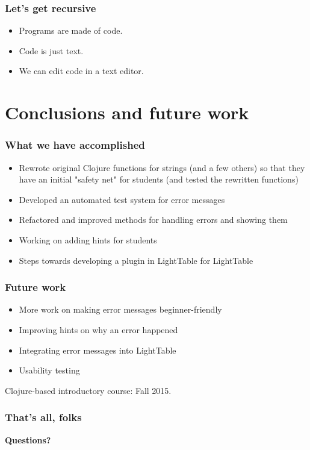 \documentclass{beamer}
\newcommand{\comment}[1]{{\bf \tt  {#1}}}
\newcommand{\emcomment}[1]{\textcolor{ForestGreen}{\comment{Elena: {#1}}}}
\begin{document}
\begin{frame}
\frametitle{Let's get recursive}
	\begin{itemize}
	\item Programs are made of code.
	\item Code is just text.
	\item We can edit code in a text editor.
	\end{itemize}
\end{frame} 

\section{Conclusions and future work}

\begin{frame}[fragile]
\frametitle{What we have accomplished}
\begin{itemize}
\item Rewrote original Clojure functions for strings (and a few others) so that they have an initial "safety net" for students (and tested the rewritten functions)
\item Developed an automated test system for error messages
\item Refactored and improved methods for handling errors and showing them 
\item Working on adding hints for students
\item Steps towards developing a plugin in LightTable for LightTable
\end{itemize}
\end{frame}

\begin{frame}[fragile]
\frametitle{Future work}
\begin{itemize}
\item More work on making error messages beginner-friendly
\item Improving hints on why an error happened
\item Integrating error messages into LightTable
\item Usability testing
\end{itemize}
Clojure-based introductory course: Fall 2015. 
\end{frame}

\begin{frame}[fragile]
\frametitle{That's all, folks}
{\bf\large Questions?}
\end{frame}
\end{document}
